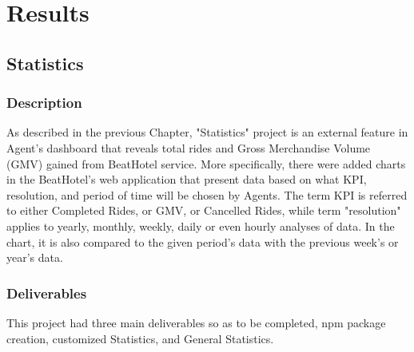 
\chapter{Results} %

\label{Chapter4}

\section{Statistics}

\subsection{Description}
As described in the previous Chapter, "Statistics" project is an external feature in Agent's dashboard that reveals total rides and Gross Merchandise Volume (GMV) gained from BeatHotel service. More specifically, there were added charts in the BeatHotel's web application that present data based on what KPI, resolution, and period of time will be chosen by Agents. The term KPI is referred to either Completed Rides, or GMV, or Cancelled Rides, while term "resolution" applies to yearly, monthly, weekly, daily or even hourly analyses of data. In the chart, it is also compared to the given period's data with the previous week's or year's data. \par

\subsection{Deliverables}
This project had three main deliverables so as to be completed, npm package creation, customized Statistics, and General Statistics. \par

